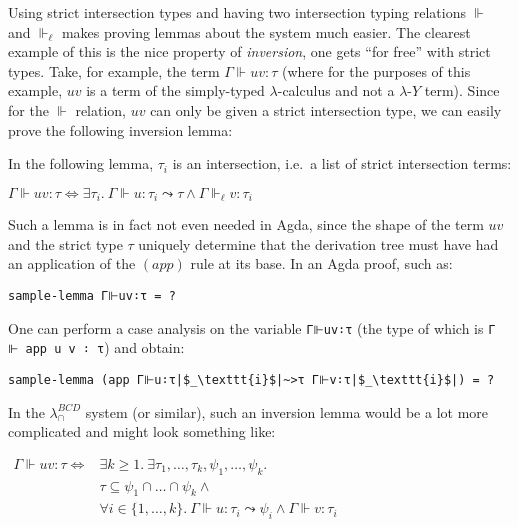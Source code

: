\documentclass[a4paper, 12pt, twoside]{style/ociamthesis}
\theoremstyle{plain}
\theoremstyle{definition}
\newtheorem{Lemma}{Lemma}[chapter]
\theoremstyle{remark}
\newtheorem*{Remark}{Remark}
\newcommand{\lamy}{\lambda\text{-}Y}
\renewenvironment{Remark}{\begin{OldRemark}\begin{mdframed}[style=example, linecolor=black]}{\end{mdframed}\end{OldRemark}}
\renewenvironment{Lemma}{\begin{OldLemma}\begin{mdframed}[style=example, linecolor=cyan]}{\end{mdframed}\end{OldLemma}}
\begin{document}
\begin{Remark}

\label{whyStrictTypes} Using strict intersection types and having two
intersection typing relations \(\Vdash\) and \(\Vdash_\ell\) makes
proving lemmas about the system much easier. The clearest example of
this is the nice property of \emph{inversion}, one gets ``for free''
with strict types. Take, for example, the term
\(\Gamma \Vdash uv : \tau\) (where for the purposes of this example,
\(uv\) is a term of the simply-typed \(\lambda\)-calculus and not a
\(\lamy\) term). Since for the \(\Vdash\) relation, \(uv\) can only be
given a strict intersection type, we can easily prove the following
inversion lemma:

\begin{Lemma}[Inversion Lemma for $(app)$]

\label{Lemma:invApp} In the following lemma, \(\tau_i\) is an
intersection, i.e.~a list of strict intersection terms:

\begin{center}
$\Gamma \Vdash uv : \tau \iff \exists \tau_i.\ \Gamma \Vdash u : \tau_i \leadsto \tau \land \Gamma \Vdash_\ell v : \tau_i$
\end{center}

\end{Lemma}

Such a lemma is in fact not even needed in Agda, since the shape of the
term \(uv\) and the strict type \(\tau\) uniquely determine that the
derivation tree must have had an application of the \((app)\) rule at
its base. In an Agda proof, such as:

\begin{verbatim}
sample-lemma Γ⊩uv∶τ = ?
\end{verbatim}

One can perform a case analysis on the variable \texttt{Γ⊩uv∶τ} (the
type of which is \texttt{Γ ⊩ app u v ∶ τ}) and obtain:

\begin{verbatim}
sample-lemma (app Γ⊩u∶τ|$_\texttt{i}$|~>τ Γ⊩v∶τ|$_\texttt{i}$|) = ?
\end{verbatim}

In the \(\lambda_\cap^{BCD}\) system (or similar), such an inversion
lemma would be a lot more complicated and might look something like:

\begin{center}
$\begin{aligned}
\Gamma \Vdash uv : \tau \iff &\exists k \geq 1.\ \exists \tau_1,\hdots,\tau_k,\psi_1,\hdots,\psi_k.\\
&\tau \subseteq \psi_1 \cap \hdots \cap \psi_k \land\\
&\forall i \in \{1,\hdots,k\}.\ \Gamma \Vdash u : \tau_i \leadsto \psi_i \land \Gamma \Vdash v : \tau_i
\end{aligned}$
\end{center}


\end{Remark}
\end{document}
